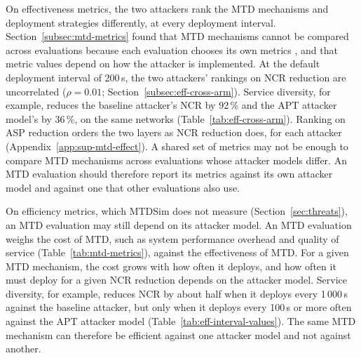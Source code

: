 \documentclass{cshonours}
\begin{document}
On effectiveness metrics, the two attackers rank the MTD mechanisms and
deployment strategies differently, at every deployment interval.
Section~\ref{subsec:mtd-metrics} found that MTD mechanisms cannot be compared
across evaluations because each evaluation chooses its own metrics
\citep{jalowski2026}, and that metric values depend on how the attacker is
implemented. At the default deployment interval of 200\,s, the
two attackers' rankings on NCR reduction are uncorrelated ($\rho = 0.01$;
Section~\ref{subsec:eff-cross-arm}). Service diversity, for example, reduces
the baseline attacker's NCR by 92\,\% and the APT attacker model's by 36\,\%,
on the same networks (Table~\ref{tab:eff-cross-arm}). Ranking on ASP reduction
orders the two layers as NCR reduction does, for each attacker
(Appendix~\ref{app:sup-mtd-effect}). A shared set of metrics may not be
enough to compare MTD mechanisms across evaluations whose attacker models
differ. An MTD evaluation should therefore report its metrics against its own
attacker model and against one that other evaluations also use.

On efficiency metrics, which MTDSim does not measure
(Section~\ref{sec:threats}), an MTD evaluation may still depend on its
attacker model. An MTD evaluation weighs the cost of MTD, such as system
performance overhead and quality of service (Table~\ref{tab:mtd-metrics}),
against the effectiveness of MTD. For a given MTD mechanism, the cost grows with
how often it deploys, and how often it must deploy for a given NCR reduction
depends on the attacker model. Service diversity, for example, reduces NCR by
about half when it deploys every 1\,000\,s against the baseline attacker, but
only when it deploys every 100\,s or more often against the APT attacker model
(Table~\ref{tab:eff-interval-values}). The same MTD mechanism can therefore be
efficient against one attacker model and not against another.
\end{document}
